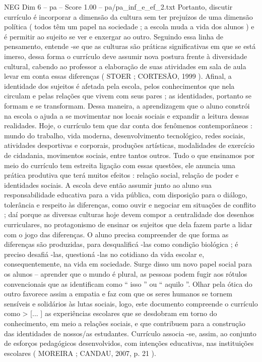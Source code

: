 \begin{textsample}{NEG Dim 6 – pa – Score 1.00 – pa/pa\_inf\_e\_ef\_2.txt}
Portanto, discutir currículo é incorporar a dimensão da cultura sem ter prejuízos de uma dimensão política ( todos têm um papel na sociedade ; a escola muda a vida dos alunos ) e é permitir ao sujeito se ver e enxergar ao outro.
Seguindo essa linha de pensamento, entende -se que as culturas são práticas significativas em que se está imerso, dessa forma o currículo deve assumir nova postura frente à diversidade cultural, cabendo ao professor a elaboração de suas atividades em sala de aula levar em conta essas diferenças ( STOER ; CORTESÃO, 1999 ).
Afinal, a identidade dos sujeitos é afetada pela escola, pelos conhecimentos que nela circulam e pelas relações que vivem com seus pares ; as identidades, portanto se formam e se transformam.
Dessa maneira, a aprendizagem que o aluno constrói na escola o ajuda a se movimentar nos locais sociais e expandir a leitura dessas realidades.
Hoje, o currículo tem que dar conta dos fenômenos contemporâneos : mundo do trabalho, vida moderna, desenvolvimento tecnológico, redes sociais, atividades desportivas e corporais, produções artísticas, modalidades de exercício de cidadania, movimentos sociais, entre tantos outros.
Tudo o que ensinamos por meio do currículo tem estreita ligação com essas questões, ele anuncia uma prática produtiva que terá muitos efeitos : relação social, relação de poder e identidades sociais.
A escola deve então assumir junto ao aluno sua responsabilidade educativa para a vida pública, com disposição para o diálogo, tolerância e respeito às diferenças, como ouvir e negociar em situações de conflito ; daí porque as diversas culturas hoje devem compor a centralidade dos desenhos curriculares, no protagonismo de ensinar os sujeitos que dela fazem parte a lidar com o jogo das diferenças.
O aluno precisa compreender de que forma as diferenças são produzidas, para desqualificá -las como condição biológica ; é preciso desafiá -las, questioná -las no cotidiano da vida escolar e, consequentemente, na vida em sociedade.
Surge disso um novo papel social para os alunos – aprender que o mundo é plural, as pessoas podem fugir aos rótulos convencionais que as identificam como “ isso ” ou “ aquilo ”.
Olhar pela ótica do outro favorece assim a empatia e faz com que os seres humanos se tornem sensíveis e solidários às lutas sociais, logo, este documento compreende o currículo como > [... ] as experiências escolares que se desdobram em torno do conhecimento, em meio a relações sociais, e que contribuem para a construção das identidades de nossos/as estudantes.
Currículo associa -se, assim, ao conjunto de esforços pedagógicos desenvolvidos, com intenções educativas, nas instituições escolares ( MOREIRA ; CANDAU, 2007, p. 21 ).

\end{textsample}

